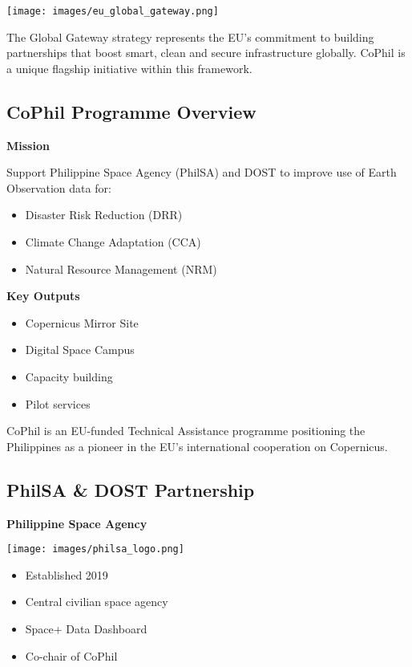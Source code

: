 \documentclass[
  letterpaper,
  DIV=11,
  numbers=noendperiod]{scrartcl}
\providecommand{\tightlist}{%
  \setlength{\itemsep}{0pt}\setlength{\parskip}{0pt}}
\begin{document}
\begin{center}
\texttt{[image: images/eu\_global\_gateway.png]}
\end{center}

The Global Gateway strategy represents the EU's commitment to building
partnerships that boost smart, clean and secure infrastructure globally.
CoPhil is a unique flagship initiative within this framework.

\subsection{CoPhil Programme Overview}\label{cophil-programme-overview}

\textbf{Mission}

Support Philippine Space Agency (PhilSA) and DOST to improve use of
Earth Observation data for:

\begin{itemize}
\tightlist
\item
  Disaster Risk Reduction (DRR)
\item
  Climate Change Adaptation (CCA)
\item
  Natural Resource Management (NRM)
\end{itemize}

\textbf{Key Outputs}

\begin{itemize}
\tightlist
\item
  Copernicus Mirror Site
\item
  Digital Space Campus
\item
  Capacity building
\item
  Pilot services
\end{itemize}

CoPhil is an EU-funded Technical Assistance programme positioning the
Philippines as a pioneer in the EU's international cooperation on
Copernicus.

\subsection{PhilSA \& DOST Partnership}\label{philsa-dost-partnership}

\textbf{Philippine Space Agency}

\texttt{[image: images/philsa\_logo.png]}

\begin{itemize}
\tightlist
\item
  Established 2019
\item
  Central civilian space agency
\item
  Space+ Data Dashboard
\item
  Co-chair of CoPhil
\end{itemize}
\end{document}
